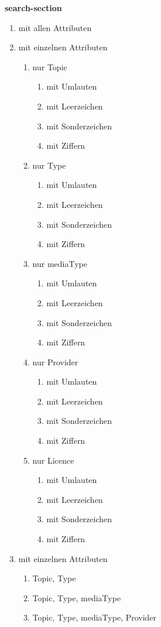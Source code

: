 \pagebreak


\flushleft \textbf{search-section}

\begin{enumerate}
  \item mit allen Attributen
  \item mit einzelnen Attributen

   \begin{enumerate}[label*=\arabic*.]
    \item nur Topic  
    \begin{enumerate}[label*=\arabic*.]
    \item mit Umlauten
    \item mit Leerzeichen
    \item mit Sonderzeichen
    \item mit Ziffern
\end{enumerate}
	\item nur Type
 	\begin{enumerate}[label*=\arabic*.]
    \item mit Umlauten
    \item mit Leerzeichen
    \item mit Sonderzeichen
    \item mit Ziffern
\end{enumerate}
	\item nur mediaType
	\begin{enumerate}[label*=\arabic*.]
    \item mit Umlauten
    \item mit Leerzeichen
    \item mit Sonderzeichen
    \item mit Ziffern
    \end{enumerate}
    \item nur Provider
	\begin{enumerate}[label*=\arabic*.]
    \item mit Umlauten
    \item mit Leerzeichen
    \item mit Sonderzeichen
    \item mit Ziffern
    \end{enumerate}
    \item nur Licence
	\begin{enumerate}[label*=\arabic*.]
    \item mit Umlauten
    \item mit Leerzeichen
    \item mit Sonderzeichen
    \item mit Ziffern
    \end{enumerate}
\end{enumerate}
\item mit einzelnen Attributen
\begin{enumerate}[label*=\arabic*.]
    \item Topic, Type
	\item Topic, Type, mediaType
	\item Topic, Type, mediaType, Provider
    \end{enumerate}
\end{enumerate}

